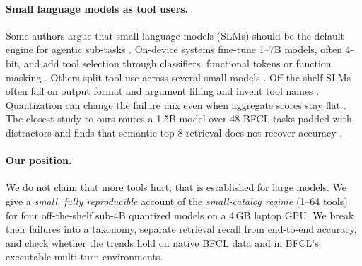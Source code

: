 \paragraph{Small language models as tool users.}
Some authors argue that small language models (SLMs) should be the default engine for agentic sub-tasks \citep{belcak2025slmfuture, sharma2025slmsurvey}. On-device systems fine-tune 1--7B models, often 4-bit, and add tool selection through classifiers, functional tokens or function masking \citep{erdogan2024tinyagent, chen2024octopusv2, lin2024hammer, zhang2025xlam}. Others split tool use across several small models \citep{shen2024smallllms}.
Off-the-shelf SLMs often fail on output format and argument filling \citep{kavathekar2025small, mastoi2026beyond, haque2025tinyllm} and invent tool names \citep{lee2026patool}. Quantization can change the failure mix even when aggregate scores stay flat \citep{dong2025acbench, roshaan2026compression, singh2026samequant, jang2026flatscore, hu2026quantrecovery}.
The closest study to ours routes a 1.5B model over 48 BFCL tasks padded with distractors and finds that semantic top-8 retrieval does not recover accuracy \citep{singla2026agentweave}.

\paragraph{Our position.}
We do not claim that more tools hurt; that is established for large models.
We give a \emph{small, fully reproducible} account of the \emph{small-catalog regime} (1--64 tools) for four off-the-shelf sub-4B quantized models on a 4\,GB laptop GPU. We break their failures into a taxonomy, separate retrieval recall from end-to-end accuracy, and check whether the trends hold on native BFCL data and in BFCL's executable multi-turn environments.
